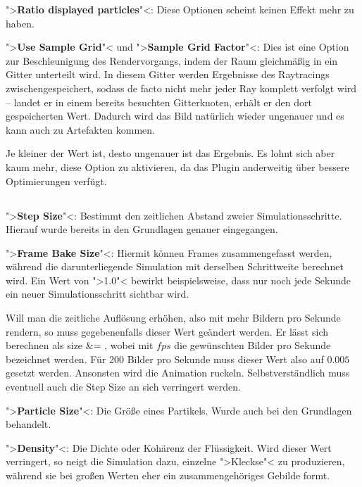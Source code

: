 \documentclass[10pt,DIV=14,a4paper]{scrartcl}
\begin{document}
	\item ">\textbf{Ratio displayed particles}"<: Diese Optionen scheint
	keinen Effekt mehr zu haben.

	\item ">\textbf{Use Sample Grid}"< und ">\textbf{Sample Grid
	Factor}"<: Dies ist eine Option zur Beschleunigung des
	Rendervorgangs, indem der Raum gleichmäßig in ein Gitter unterteilt
	wird. In diesem Gitter werden Ergebnisse des Raytracings
	zwischengespeichert, sodass de facto nicht mehr jeder Ray komplett
	verfolgt wird -- landet er in einem bereits besuchten Gitterknoten,
	erhält er den dort gespeicherten Wert. Dadurch wird das Bild
	natürlich wieder ungenauer und es kann auch zu Artefakten kommen.

	Je kleiner der Wert ist, desto ungenauer ist das Ergebnis. Es lohnt
	sich aber kaum mehr, diese Option zu aktivieren, da das Plugin
	anderweitig über bessere Optimierungen verfügt.

\itE

\subsection{}
\itA
	\item ">\textbf{Step Size}"<: Bestimmt den zeitlichen Abstand zweier
	Simulationsschritte. Hierauf wurde bereits in den Grundlagen genauer
	eingegangen.

	\item ">\textbf{Frame Bake Size}"<: Hiermit können Frames
	zusammengefasst werden, während die darunterliegende Simulation mit
	derselben Schrittweite berechnet wird. Ein Wert von ">1.0"< bewirkt
	beispielsweise, dass nur noch jede Sekunde ein neuer
	Simulationsschritt sichtbar wird.

	Will man die zeitliche Auflösung erhöhen, also mit mehr Bildern pro
	Sekunde rendern, so muss gegebenenfalls dieser Wert geändert
	werden. Er lässt sich berechnen als
	\aleq
	{
		size &=  \qq ,
	}
	wobei mit $fps$ die gewünschten Bilder pro Sekunde bezeichnet
	werden. Für 200 Bilder pro Sekunde muss dieser Wert also auf $0.005$
	gesetzt werden. Ansonsten wird die Animation ruckeln.
	Selbstverständlich muss eventuell auch die Step Size an sich
	verringert werden.

	\item ">\textbf{Particle Size}"<: Die Größe eines Partikels. Wurde
	auch bei den Grundlagen behandelt.

	\item ">\textbf{Density}"<: Die Dichte oder Kohärenz der
	Flüssigkeit. Wird dieser Wert verringert, so neigt die Simulation
	dazu, einzelne ">Kleckse"< zu produzieren, während sie bei großen
	Werten eher ein zusammengehöriges Gebilde formt.
\end{document}
